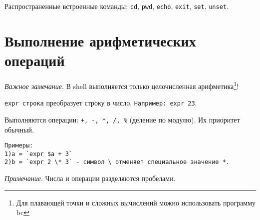 Распространенные встроенные команды: \verb+cd+, \verb+pwd+, \verb+echo+, \verb+exit+, \verb+set+, \verb+unset+.


\section{Выполнение арифметических операций}

\emph{Важное замечание}. В shell выполняется только целочисленная арифметика\footnote{Для плавающей точки и сложных вычислений можно использовать программу bc}!

\verb+еxpr строка+  преобразует строку в число. \verb+Например: expr 23+.

Выполняются операции: \verb=+, -, *, /, %= (деление по модулю). Их приоритет обычный.
\begin{verbatim}
Примеры: 
1)a = `expr $a + 3`
2)b = `expr 2 \* 3` - символ \ отменяет специальное значение *.
\end{verbatim}
\emph{Примечание}. Числа и операции разделяются пробелами.
